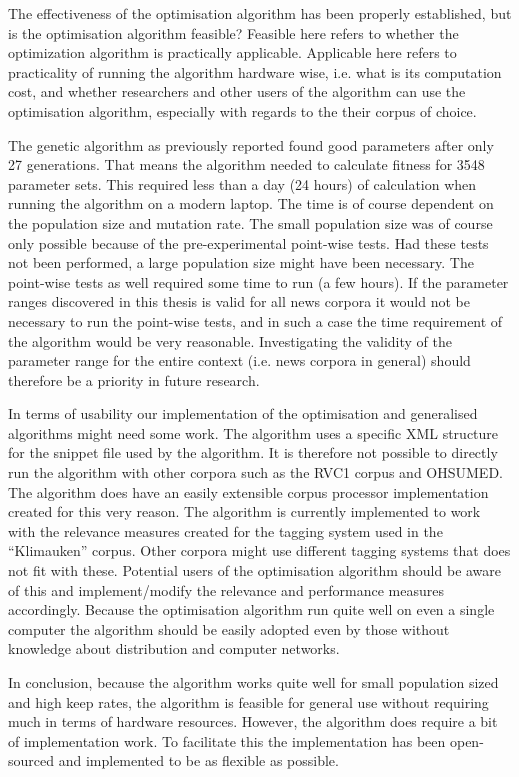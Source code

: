 The effectiveness of the optimisation algorithm has been properly established, but is the optimisation algorithm feasible? Feasible here refers to whether the optimization algorithm is practically applicable. Applicable here refers to practicality of running the algorithm hardware wise, i.e. what is its computation cost, and whether researchers and other users of the \CTC algorithm can use the optimisation algorithm, especially with regards to the their corpus of choice.

The genetic algorithm as previously reported found good parameters after only 27 generations. That means the algorithm needed to calculate fitness for 3548 parameter sets. This required less than a day (24 hours) of calculation when running the algorithm on a modern laptop. The time is of course dependent on the population size and mutation rate. The small population size was of course only possible because of the pre-experimental point-wise tests. Had these tests not been performed, a large population size might have been necessary. The point-wise tests as well required some time to run (a few hours). If the parameter ranges discovered in this thesis is valid for all news corpora it would not be necessary to run the point-wise tests, and in such a case the time requirement of the algorithm would be very reasonable. Investigating the validity of the parameter range for the entire context (i.e. news corpora in general) should therefore be a priority in future research.

In terms of usability our implementation of the optimisation and generalised \CTC algorithms might need some work. The \CTC algorithm uses a specific XML structure for the snippet file used by the algorithm. It is therefore not possible to directly run the algorithm with other corpora such as the RVC1 corpus and OHSUMED. The algorithm does have an easily extensible corpus processor implementation created for this very reason. The algorithm is currently implemented to work with the relevance measures created for the tagging system used in the ``Klimauken'' corpus. Other corpora might use different tagging systems that does not fit with these. Potential users of the optimisation algorithm should be aware of this and implement/modify the relevance and performance measures accordingly. Because the optimisation algorithm run quite well on even a single computer the algorithm should be easily adopted even by those without knowledge about distribution and computer networks.

In conclusion, because the algorithm works quite well for small population sized and high keep rates, the algorithm is feasible for general use without requiring much in terms of hardware resources. However, the algorithm does require a bit of implementation work. To facilitate this the implementation has been open-sourced and implemented to be as flexible as possible.